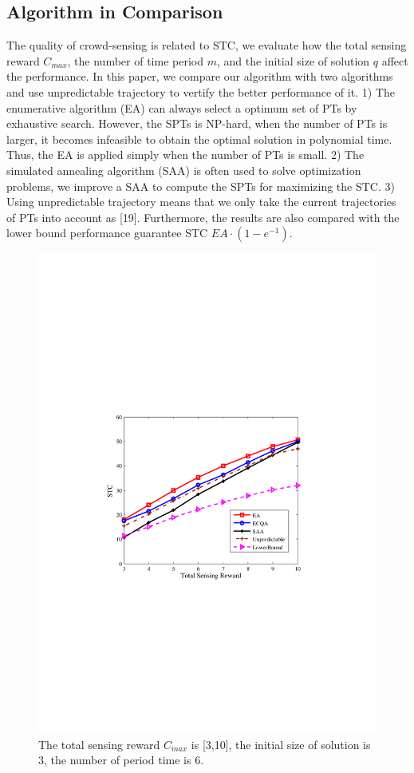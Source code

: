 \documentclass[journal]{IEEEtran}
\begin{document}
\subsection{Algorithm in Comparison}
The quality of crowd-sensing is related to STC, we evaluate how the total sensing reward $C_{max}$, the number of time period $m$, and the initial size of solution $q$ affect the performance. In this paper, we compare our algorithm with two algorithms and use unpredictable trajectory to vertify the better performance of it. 1) The enumerative algorithm (EA) can always select a optimum set of PTs by exhaustive search. However, the SPTs is NP-hard, when the number of PTs is larger, it becomes infeasible to obtain the optimal solution in polynomial time. Thus, the EA is applied simply when the number of PTs is small. 2) The simulated annealing algorithm (SAA) is often used to solve optimization problems, we improve a SAA to compute the SPTs for maximizing the STC. 3) Using unpredictable trajectory means that we only take the current trajectories of PTs into account as [19]. Furthermore, the results are also compared with the lower bound performance guarantee STC $EA\cdot(1-e^{-1})$.

\begin{figure}[h]
	\centering
	\includegraphics[width=0.85\linewidth]{figure4.pdf}
	\caption{The total sensing reward $C_{max}$ is [3,10], the initial size of solution is 3, the number of period time is 6.}
	\label{fig:figure4}
\end{figure}
\end{document}

